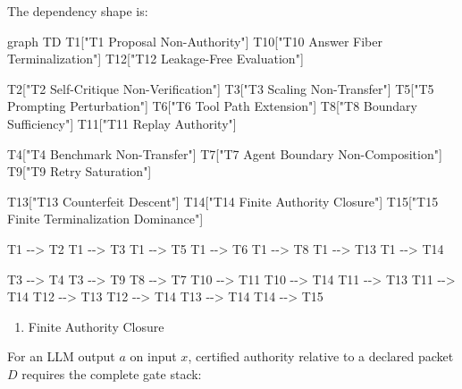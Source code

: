 \documentclass[
  10pt,
]{article}
\newenvironment{Shaded}{}{}
\newcommand{\NormalTok}[1]{#1}
\providecommand{\tightlist}{%
  \setlength{\itemsep}{0pt}\setlength{\parskip}{0pt}}
\providecommand{\tightlist}{%
  \setlength{\itemsep}{0pt}\setlength{\parskip}{0pt}}
\begin{document}
The dependency shape is:

\begin{Shaded}
\begin{Highlighting}[]
\NormalTok{graph TD}
\NormalTok{    T1["T1 Proposal Non{-}Authority"]}
\NormalTok{    T10["T10 Answer Fiber Terminalization"]}
\NormalTok{    T12["T12 Leakage{-}Free Evaluation"]}

\NormalTok{    T2["T2 Self{-}Critique Non{-}Verification"]}
\NormalTok{    T3["T3 Scaling Non{-}Transfer"]}
\NormalTok{    T5["T5 Prompting Perturbation"]}
\NormalTok{    T6["T6 Tool Path Extension"]}
\NormalTok{    T8["T8 Boundary Sufficiency"]}
\NormalTok{    T11["T11 Replay Authority"]}

\NormalTok{    T4["T4 Benchmark Non{-}Transfer"]}
\NormalTok{    T7["T7 Agent Boundary Non{-}Composition"]}
\NormalTok{    T9["T9 Retry Saturation"]}

\NormalTok{    T13["T13 Counterfeit Descent"]}
\NormalTok{    T14["T14 Finite Authority Closure"]}
\NormalTok{    T15["T15 Finite Terminalization Dominance"]}

\NormalTok{    T1 {-}{-}\textgreater{} T2}
\NormalTok{    T1 {-}{-}\textgreater{} T3}
\NormalTok{    T1 {-}{-}\textgreater{} T5}
\NormalTok{    T1 {-}{-}\textgreater{} T6}
\NormalTok{    T1 {-}{-}\textgreater{} T8}
\NormalTok{    T1 {-}{-}\textgreater{} T13}
\NormalTok{    T1 {-}{-}\textgreater{} T14}

\NormalTok{    T3 {-}{-}\textgreater{} T4}
\NormalTok{    T3 {-}{-}\textgreater{} T9}
\NormalTok{    T8 {-}{-}\textgreater{} T7}
\NormalTok{    T10 {-}{-}\textgreater{} T11}
\NormalTok{    T10 {-}{-}\textgreater{} T14}
\NormalTok{    T11 {-}{-}\textgreater{} T13}
\NormalTok{    T11 {-}{-}\textgreater{} T14}
\NormalTok{    T12 {-}{-}\textgreater{} T13}
\NormalTok{    T12 {-}{-}\textgreater{} T14}
\NormalTok{    T13 {-}{-}\textgreater{} T14}
\NormalTok{    T14 {-}{-}\textgreater{} T15}
\end{Highlighting}
\end{Shaded}

\begin{enumerate}
\def\labelenumi{\arabic{enumi}.}
\setcounter{enumi}{5}
\tightlist
\item
  Finite Authority Closure
\end{enumerate}

For an LLM output \protect\hypertarget{math-E0095-0120}{}{\(a\)} on input \protect\hypertarget{math-E0019-0121}{}{\(x\)}, certified authority relative to a declared packet \protect\hypertarget{math-E0009-0122}{}{\(D\)} requires the complete gate stack:
\end{document}
